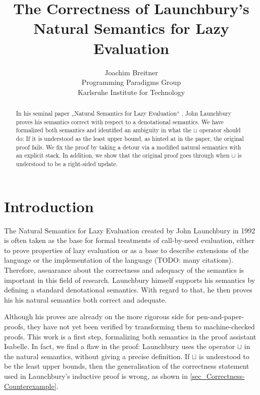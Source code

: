 \documentclass[11pt,a4paper,parskip=half]{scrartcl}
\begin{document}
\title{The Correctness of Launchbury's Natural Semantics for Lazy Evaluation}
\author{Joachim Breitner\\
Programming Paradigms Group\\
Karlsruhe Institute for Technology}
\maketitle

\begin{abstract}
In his seminal paper „Natural Semantics for Lazy Evaluation“ \cite{launchbury},
John Launchbury proves his semantics correct with respect to a denotational
semantics. We have formalized both semantics and identified an ambiguity in
what the $\sqcup$ operator should do: If it is understood as the least upper
bound, as hinted at in the paper, the original proof fails.  We fix the proof
by taking a detour via a modified natural semantics with an explicit stack. In
addition, we show that the original proof goes through when $\sqcup$ is
understood to be a right-sided update.
\end{abstract}

\tableofcontents

\section{Introduction}

The Natural Semantics for Lazy Evaluation \cite{launchbury} created by John Launchbury in 1992 is often taken as the base for formal treatments of call-by-need evaluation, either to prove properties of lazy evaluation or as a base to describe extensions of the language or the implementation of the language (TODO: many citations). Therefore, assuarance about the correctness and adequacy of the semantics is important in this field of research. Launchbury himself supports his semantics by defining a standard denotational semantics. With regard to that, he then proves his his natural semantics both correct and adequate.

Although his proves are already on the more rigorous side for pen-and-paper-proofs, they have not yet been verified by transforming them to machine-checked proofs. This work is a first step, formalizing both semantics in the proof assistant Isabelle. In fact, we find a flaw in the proof: Launchbury uses the operator $\sqcup$ in the natural semantics, without giving a precise definition. If $\sqcup$ is understood to be the least upper bounds, then the generalisation of the correctness statement used in Launchbury's inductive proof is wrong, as shown in \ref{sec_Correctness-Counterexample}.
\end{document}
